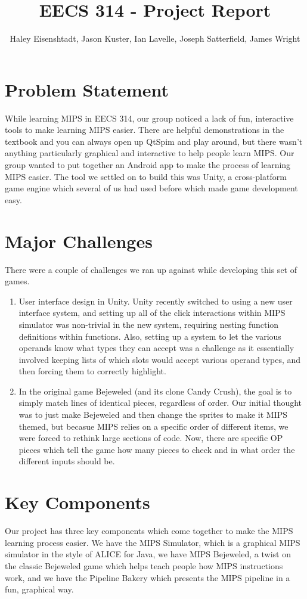 \documentclass[12pt]{article}
\title{EECS 314 - Project Report}
\author{Haley Eisenshtadt, Jason Kuster, Ian Lavelle, Joseph Satterfield, James Wright}
\begin{document}
	\maketitle
	\section{Problem Statement}
	While learning MIPS in EECS 314, our group noticed a lack of fun, interactive tools to make learning MIPS easier. There are helpful demonstrations in the textbook and you can always open up QtSpim and play around, but there wasn't anything particularly graphical and interactive to help people learn MIPS. Our group wanted to put together an Android app to make the process of learning MIPS easier. The tool we settled on to build this was Unity, a cross-platform game engine which several of us had used before which made game development easy.
	\section{Major Challenges}
	There were a couple of challenges we ran up against while developing this set of games.
	\begin{enumerate}
		\item User interface design in Unity. Unity recently switched to using a new user interface system, and setting up all of the click interactions within MIPS simulator was non-trivial in the new system, requiring nesting function definitions within functions. Also, setting up a system to let the various operands know what types they can accept was a challenge as it essentially involved keeping lists of which slots would accept various operand types, and then forcing them to correctly highlight.
		\item In the original game Bejeweled (and its clone Candy Crush), the goal is to simply match lines of identical pieces, regardless of order. Our initial thought was to just make Bejeweled and then change the sprites to make it MIPS themed, but becasue MIPS relies on a specific order of different items, we were forced to rethink large sections of code. Now, there are specific OP pieces which tell the game how many pieces to check and in what order the different inputs should be.
	\end{enumerate}
	\section{Key Components}
	Our project has three key components which come together to make the MIPS learning process easier. We have the MIPS Simulator, which is a graphical MIPS simulator in the style of ALICE for Java, we have MIPS Bejeweled, a twist on the classic Bejeweled game which helps teach people how MIPS instructions work, and we have the Pipeline Bakery which presents the MIPS pipeline in a fun, graphical way.
\end{document}
